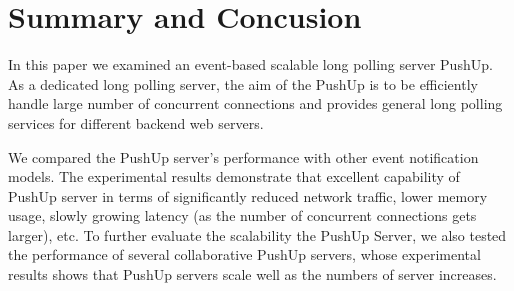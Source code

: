 \section{Summary and Concusion\\}

In this paper we examined an event-based scalable long polling server PushUp.
As a dedicated long polling server, the aim of the PushUp is to be efficiently
handle large number of concurrent connections and provides general long 
polling services for different backend web servers.

We compared the PushUp server's performance with other event notification 
models. The experimental results demonstrate that excellent capability of 
PushUp server in terms of significantly reduced network traffic, lower memory 
usage, slowly growing latency (as the number of concurrent connections gets 
larger), etc. To further evaluate the scalability the PushUp Server, we also
tested the performance of several collaborative PushUp servers, whose 
experimental results shows that PushUp servers scale well as the numbers of
server increases.


